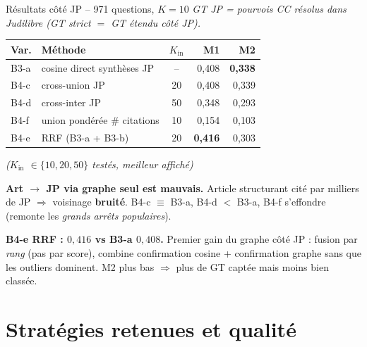 \documentclass[aspectratio=169,10pt]{beamer}
\newcommand{\warnbox}[1]{%
  \begin{center}
  \colorbox{red!10}{\parbox{0.92\linewidth}{\centering #1}}
  \end{center}}
\newcommand{\okbox}[1]{%
  \begin{center}
  \colorbox{green!10}{\parbox{0.92\linewidth}{\centering #1}}
  \end{center}}
\begin{document}
\begin{frame}{Résultats côté JP -- 971 questions, $K{=}10$}
  \scriptsize
  \textit{GT JP = pourvois CC résolus dans Judilibre (GT strict $=$ GT étendu côté JP).}

  \vspace{0.3em}
  \renewcommand{\arraystretch}{1.0}
  \setlength{\tabcolsep}{4pt}
  \begin{center}
  \begin{tabular}{@{}l l c | r r@{}}
    \toprule
    \textbf{Var.} & \textbf{Méthode} & $K_{\text{in}}$ & \textbf{M1} & \textbf{M2} \\
    \midrule
    B3-a & cosine direct synthèses JP    & --   & 0,408 & \textbf{0,338} \\
    \midrule
    B4-c & cross-union JP                & 20   & 0,408 & 0,339 \\
    B4-d & cross-inter JP                & 50   & 0,348 & 0,293 \\
    B4-f & union pondérée \# citations   & 10   & 0,154 & 0,103 \\
    \midrule
    \rowcolor{accentsoft}
    B4-e & RRF (B3-a + B3-b)             & 20   & \textbf{0,416} & 0,303 \\
    \bottomrule
  \end{tabular}
  \quad\tiny\textit{($K_{\text{in}}$ $\in \{10, 20, 50\}$ testés, meilleur affiché)}
  \end{center}

  \vspace{0.2em}
  \warnbox{\scriptsize\textbf{Art $\to$ JP via graphe seul est mauvais.}
  Article structurant cité par milliers de JP $\Rightarrow$ voisinage \textbf{bruité}.
  B4-c $\equiv$ B3-a, B4-d $<$ B3-a, B4-f s'effondre (remonte les \emph{grands arrêts populaires}).}

  \vspace{0.2em}
  \okbox{\scriptsize\textbf{B4-e RRF : $0{,}416$ vs B3-a $0{,}408$.}
  Premier gain du graphe côté JP : fusion par \emph{rang} (pas par score), combine confirmation
  cosine + confirmation graphe sans que les outliers dominent. M2 plus bas $\Rightarrow$ plus de GT
  captée mais moins bien classée.}
\end{frame}

\section{Stratégies retenues et qualité}
\end{document}
